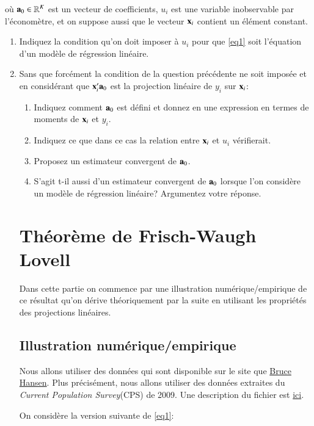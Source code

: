 où ${\mathbf a}_0\in \mathbb{R}^K$ est un vecteur de coefficients, $u_i$ est une variable inobservable par l'économètre, et on suppose aussi
que le vecteur ${\mathbf x}_i$ contient un élément constant.

\begin{enumerate}
\item Indiquez la condition qu'on doit imposer à $u_i$ pour que \eqref{eq1} soit l'équation d'un modèle de régression linéaire.
\item Sans que forcément la condition de la question précédente ne soit imposée et en considérant que ${\mathbf x}_i^\prime{\mathbf a}_0$
est la projection linéaire de $y_i$ sur ${\mathbf x}_i$:
\begin{enumerate}
  \item Indiquez comment ${\mathbf a}_0$ est défini et donnez en une expression en termes de moments de ${\mathbf x}_i$ et $y_i$.
  \item Indiquez ce que dans ce cas la relation entre ${\mathbf x}_i$ et $u_i$ vérifierait.
  \item Proposez un estimateur convergent de ${\mathbf a}_0$.
  \item S'agit t-il aussi d'un estimateur convergent de ${\mathbf a}_0$ lorsque l'on considère un modèle de régression linéaire? Argumentez votre réponse.
\end{enumerate}

\section{Théorème de Frisch-Waugh Lovell}

Dans cette partie on commence par une illustration numérique/empirique de ce résultat qu'on dérive théoriquement par la suite 
en utilisant les propriétés des projections linéaires.

\subsection{Illustration numérique/empirique}

Nous allons utiliser des données qui sont 
disponible sur le site que \href{https://www.ssc.wisc.edu/~bhansen/}{Bruce Hansen}. 
Plus précisément, nous allons utiliser des données extraites du \emph{Current Population Survey}(CPS) de 2009. 
Une description du fichier est \href{https://www.ssc.wisc.edu/~bhansen/econometrics/cps09mar_description.pdf}{ici}.

\medskip

On considère la version suivante de \eqref{eq1}:


\end{enumerate}
